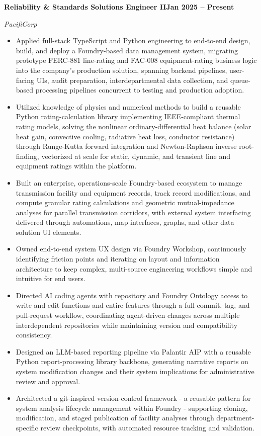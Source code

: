 \documentclass[10pt, letterpaper]{article}
\newcommand{\jobline}[2]{%
  \vspace{5pt}%
  \noindent\textbf{#1}\hfill\textbf{#2}\par%
  \vspace{1pt}%
}
\newcommand{\subline}[1]{%
  \vspace{-1pt}%
  \noindent\textit{#1}\par%
  \vspace{1pt}%
}
\newenvironment{rlist}{%
  \begin{itemize}[leftmargin=1.4em, itemsep=1pt, topsep=2pt, parsep=0pt]%
}{%
  \end{itemize}%
}
\begin{document}
\jobline{Reliability \& Standards Solutions Engineer II}{Jan 2025 -- Present}
\subline{PacifiCorp}
\begin{rlist}
  \item Applied full-stack TypeScript and Python engineering to end-to-end design, build, and deploy a Foundry-based data management system, migrating prototype FERC-881 line-rating and FAC-008 equipment-rating business logic into the company's production solution, spanning backend pipelines, user-facing UIs, audit preparation, interdepartmental data collection, and queue-based processing pipelines concurrent to testing and production adoption.
  \item Utilized knowledge of physics and numerical methods to build a reusable Python rating-calculation library implementing IEEE-compliant thermal rating models, solving the nonlinear ordinary-differential heat balance (solar heat gain, convective cooling, radiative heat loss, conductor resistance) through Runge-Kutta forward integration and Newton-Raphson inverse root-finding, vectorized at scale for static, dynamic, and transient line and equipment ratings within the platform.
  \item Built an enterprise, operations-scale Foundry-based ecosystem to manage transmission facility and equipment records, track record modifications, and compute granular rating calculations and geometric mutual-impedance analyses for parallel transmission corridors, with external system interfacing delivered through automations, map interfaces, graphs, and other data solution UI elements.
  \item Owned end-to-end system UX design via Foundry Workshop, continuously identifying friction points and iterating on layout and information architecture to keep complex, multi-source engineering workflows simple and intuitive for end users.
  \item Directed AI coding agents with repository and Foundry Ontology access to write and edit functions and entire features through a full commit, tag, and pull-request workflow, coordinating agent-driven changes across multiple interdependent repositories while maintaining version and compatibility consistency.
  \item Designed an LLM-based reporting pipeline via Palantir AIP with a reusable Python report-processing library backbone, generating narrative reports on system modification changes and their system implications for administrative review and approval.
  \item Architected a git-inspired version-control framework - a reusable pattern for system analysis lifecycle management within Foundry - supporting cloning, modification, and staged publication of facility analyses through department-specific review checkpoints, with automated resource tracking and validation.

\end{rlist}
\end{document}
